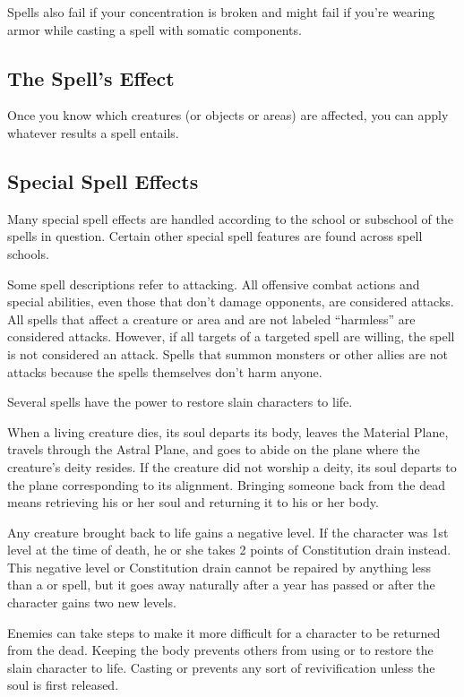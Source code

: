 Spells also fail if your concentration is broken and might fail if you're wearing armor while casting a spell with somatic components.

\subsection{The Spell's Effect}
Once you know which creatures (or objects or areas) are affected, you can apply whatever results a spell entails.

\subsection{Special Spell Effects}
Many special spell effects are handled according to the school or subschool of the
spells in question. Certain other special spell features are found across spell schools.

 Some spell descriptions refer to attacking. All offensive combat actions and special abilities, even those that don't damage opponents, are considered attacks. All spells that affect a creature or area and are not labeled ``harmless'' are considered attacks. However, if all targets of a targeted spell are willing, the spell is not considered an attack. Spells that summon monsters or other allies are not attacks because the spells themselves don't harm anyone.

\label{Bringing Back the Dead}
 Several spells have the power to restore slain characters to life.

When a living creature dies, its soul departs its body, leaves the Material Plane, travels through the Astral Plane, and goes to abide on the plane where the creature's deity resides. If the creature did not worship a deity, its soul departs to the plane corresponding to its alignment. Bringing someone back from the dead means retrieving his or her soul and returning it to his or her body.

 Any creature brought back to life gains a negative level. If the character was 1st level at the time of death, he or she takes 2 points of Constitution drain instead. This negative level or Constitution drain cannot be repaired by anything less than a  or  spell, but it goes away naturally after a year has passed or after the character gains two new levels.

 Enemies can take steps to make it more difficult for a character to be returned from the dead. Keeping the body prevents others from using   or  to restore the slain character to life. Casting  or  prevents any sort of revivification unless the soul is first released.


